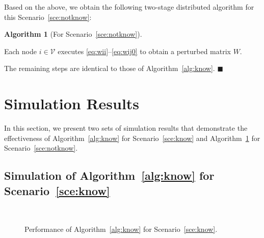 \documentclass[11pt]{article}
\theoremstyle{plain}
\theoremstyle{definition}
\newtheorem{algorithm}{Algorithm}
\theoremstyle{remark}
\newenvironment{algorithmstep}{\ \begin{list}{\labelenumi}{\topsep0in\itemsep0in\parsep0in\labelwidth1in\usecounter{enumi}}}{\hfill$\blacksquare$\end{list}}
\begin{document}
Based on the above, we obtain the following two-stage distributed algorithm for this Scenario~\ref{sce:notknow}:

\begin{algorithm}[For Scenario~\ref{sce:notknow}]\label{alg:notknow}
\begin{algorithmstep}
\item Each node $i\in\mathcal{V}$ executes \eqref{eq:wii}--\eqref{eq:wij0} to obtain a perturbed matrix $W$.
\item The remaining steps are identical to those of Algorithm~\ref{alg:know}.
\end{algorithmstep}
\end{algorithm}

\section{Simulation Results}\label{sec:simuresu}

In this section, we present two sets of simulation results that demonstrate the effectiveness of Algorithm~\ref{alg:know} for Scenario~\ref{sce:know} and Algorithm~\ref{alg:notknow} for Scenario~\ref{sce:notknow}.

\subsection{Simulation of Algorithm~\ref{alg:know} for Scenario~\ref{sce:know}}\label{ssec:simualgoscenknow}

\begin{figure}[tb]
\centering{}\quad{}\\ \quad{}
\caption{Performance of Algorithm~\ref{alg:know} for Scenario~\ref{sce:know}.}
\label{fig:sce1}
\end{figure}
\end{document}
